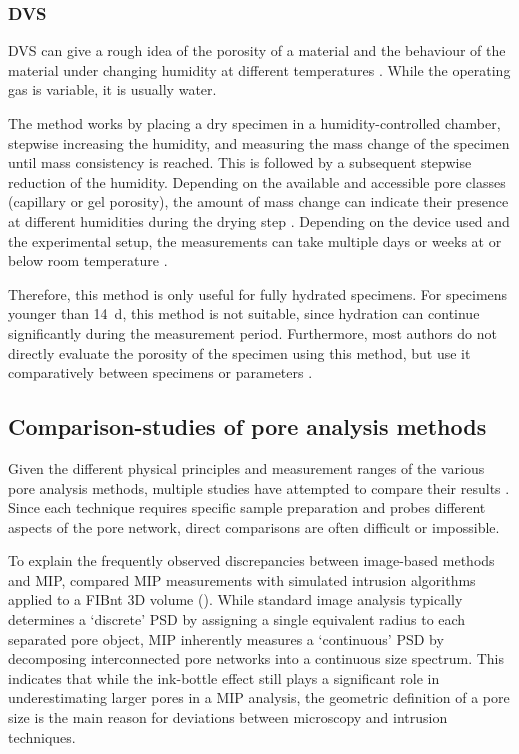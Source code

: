 \subsubsection[Dynamic vapour sorption]{\Acl*{DVS}}

\Ac{DVS} can give a rough idea of the porosity of a material \cite{pinson.2015} and the behaviour of the material under changing humidity at different temperatures \cite{wang.2023}.
While the operating gas is variable, it is usually water.

The method works by placing a dry specimen in a humidity-controlled chamber, stepwise increasing the humidity, and measuring the mass change of the specimen until mass consistency is reached.
This is followed by a subsequent stepwise reduction of the humidity.
Depending on the available and accessible pore classes (capillary or gel porosity), the amount of mass change can indicate their presence at different humidities during the drying step \cite{pinson.2015}.
Depending on the device used and the experimental setup, the measurements can take multiple days or weeks at or below room temperature \cite{wang.2023}.

Therefore, this method is only useful for fully hydrated specimens.
For specimens younger than \qty{14}{\day}, this method is not suitable, since hydration can continue significantly during the measurement period.
Furthermore, most authors do not directly evaluate the porosity of the specimen using this method, but use it comparatively between specimens or parameters \cite{ghantous.2023, wang.2023}.

\subsection{Comparison-studies of pore analysis methods}
\label{subsec:pore_comparison}

Given the different physical principles and measurement ranges of the various pore analysis methods, multiple studies have attempted to compare their results \cite{munch.2008, naber.2020, georget.2024}.
Since each technique requires specific sample preparation and probes different aspects of the pore network, direct comparisons are often difficult or impossible.

To explain the frequently observed discrepancies between image-based methods and \ac{MIP}, \textcite{munch.2008} compared \ac{MIP} measurements with simulated intrusion algorithms applied to a \ac{FIBnt} 3D volume ().
While standard image analysis typically determines a `discrete' \ac{PSD} by assigning a single equivalent radius to each separated pore object, \ac{MIP} inherently measures a `continuous' \ac{PSD} by decomposing interconnected pore networks into a continuous size spectrum.
This indicates that while the ink-bottle effect still plays a significant role in underestimating larger pores in a \ac{MIP} analysis, the geometric definition of a pore size is the main reason for deviations between microscopy and intrusion techniques.

